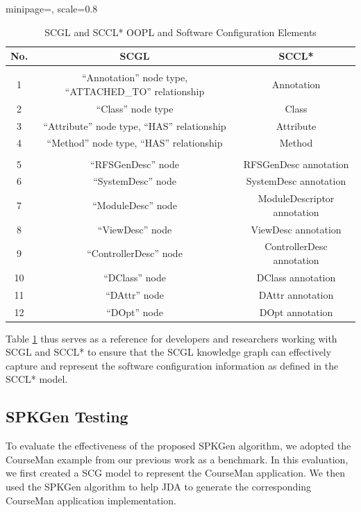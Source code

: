 \documentclass[runningheads]{llncs}
\begin{document}
\begin{table}[h!]
\centering
\begin{adjustbox}{minipage=\textwidth, scale=0.8}
\caption{SCGL and SCCL* OOPL and Software Configuration Elements} \label{tab:eval-scgl}
\begin{tabular}{|c|c|c|}
\hline \rowcolor[gray]{0.8}%
\textbf{No.} & \textbf{SCGL} & \textbf{SCCL*} \\ \hline \rowcolor[gray]{0.8}%
\multicolumn{3}{|c|}{\textbf{OOPL Elements}} \\ \hline
1 & ``Annotation'' node type, “ATTACHED\_TO” relationship & Annotation \\ \hline
2 & “Class” node type & Class \\ \hline
3 & “Attribute” node type, “HAS” relationship & Attribute \\ \hline
4 & “Method” node type, “HAS” relationship & Method \\ \hline  \rowcolor[gray]{0.8}%
\multicolumn{3}{|c|}{\textbf{Software Configuration Elements}} \\ \hline
5 & “RFSGenDesc” node & RFSGenDesc annotation \\ \hline
6 & “SystemDesc” node & SystemDesc annotation \\ \hline
7 & “ModuleDesc” node & ModuleDescriptor annotation \\ \hline
8 & “ViewDesc” node & ViewDesc annotation \\ \hline
9 & “ControllerDesc” node & ControllerDesc annotation \\ \hline
10 & “DClass” node & DClass annotation \\ \hline
11 & “DAttr” node & DAttr annotation \\ \hline
12 & “DOpt” node & DOpt annotation \\ \hline
\end{tabular}
\end{adjustbox}
\end{table}

Table \ref{tab:eval-scgl} thus serves as a reference for developers and researchers working with SCGL and SCCL* to ensure that the SCGL knowledge graph can effectively capture and represent the software configuration information as defined in the SCCL* model.

\subsection{SPKGen Testing}
To evaluate the effectiveness of the proposed SPKGen algorithm, we adopted the CourseMan example from our previous work as a benchmark. In this evaluation, we first created a SCG model to represent the CourseMan application. We then used the SPKGen algorithm to help JDA to generate the corresponding CourseMan application implementation. 
\end{document}

